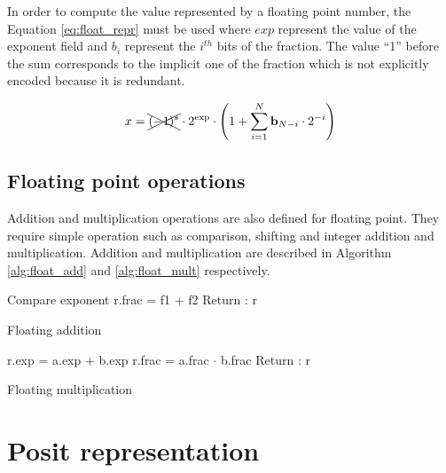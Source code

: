 In order to compute the value represented by a floating point number, the Equation \ref{eq:float_repr} must be used where $exp$ represent the value of the exponent field and $b_i$ represent the $i^{th}$ bits of the fraction. The value ``1'' before the sum corresponds to the implicit one of the fraction which is not explicitly encoded because it is redundant.

\begin{equation}
x = \xcancel{(-1)^s} \cdot 2^{\text{exp}} \cdot \left( 1 + \sum_{i=1}^{N} \text{\textbf{b}}_{N-i} \cdot 2^{-i}\right)
\label{eq:float_repr}
\end{equation}

\subsection{Floating point operations}
Addition and multiplication operations are also defined for floating point. They require simple operation such as comparison, shifting and integer addition and multiplication. Addition and multiplication are described in Algorithm \ref{alg:float_add} and \ref{alg:float_mult} respectively.

\begin{algorithm}[!ht]
\SetAlgoLined
{}
Compare exponent\;
r.frac = f1 + f2\;
Return : r\;
\caption{Floating addition}
\label{alg:float_add}
\end{algorithm}

\begin{algorithm}[!ht]
\SetAlgoLined
{}
r.exp = a.exp + b.exp\;
r.frac = a.frac $\cdot$ b.frac\;
Return : r\;
\caption{Floating multiplication}
\label{alg:float_mult}
\end{algorithm}


\section{Posit representation}

